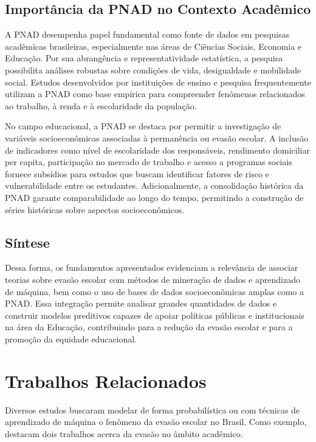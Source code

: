 \documentclass[english, spanish, brazilian]{RBIEarticle} %
\begin{document}
\subsection{Importância da PNAD no Contexto Acadêmico}
A PNAD desempenha papel fundamental como fonte de dados em pesquisas acadêmicas brasileiras, especialmente nas áreas de Ciências Sociais, Economia e Educação. Por sua abrangência e representatividade estatística, a pesquisa possibilita análises robustas sobre condições de vida, desigualdade e mobilidade social. Estudos desenvolvidos por instituições de ensino e pesquisa frequentemente utilizam a PNAD como base empírica para compreender fenômenos relacionados ao trabalho, à renda e à escolaridade da população.

No campo educacional, a PNAD se destaca por permitir a investigação de variáveis socioeconômicas associadas à permanência ou evasão escolar. A inclusão de indicadores como nível de escolaridade dos responsáveis, rendimento domiciliar per capita, participação no mercado de trabalho e acesso a programas sociais fornece subsídios para estudos que buscam identificar fatores de risco e vulnerabilidade entre os estudantes. Adicionalmente, a consolidação histórica da PNAD garante comparabilidade ao longo do tempo, permitindo a construção de séries históricas sobre aspectos socioeconômicos.

\subsection{Síntese}
Dessa forma, os fundamentos apresentados evidenciam a relevância de associar teorias sobre evasão escolar com métodos de mineração de dados e aprendizado de máquina, bem como o uso de bases de dados socioeconômicas amplas como a PNAD. Essa integração permite analisar grandes quantidades de dados e construir modelos preditivos capazes de apoiar políticas públicas e institucionais na área da Educação, contribuindo para a redução da evasão escolar e para a promoção da equidade educacional.

\section{Trabalhos Relacionados}
Diversos estudos buscaram modelar de forma probabilística ou com técnicas de aprendizado de máquina o fenômeno da evasão escolar no Brasil. Como exemplo, destacam dois trabalhos acerca da evasão no âmbito acadêmico.
\end{document}
